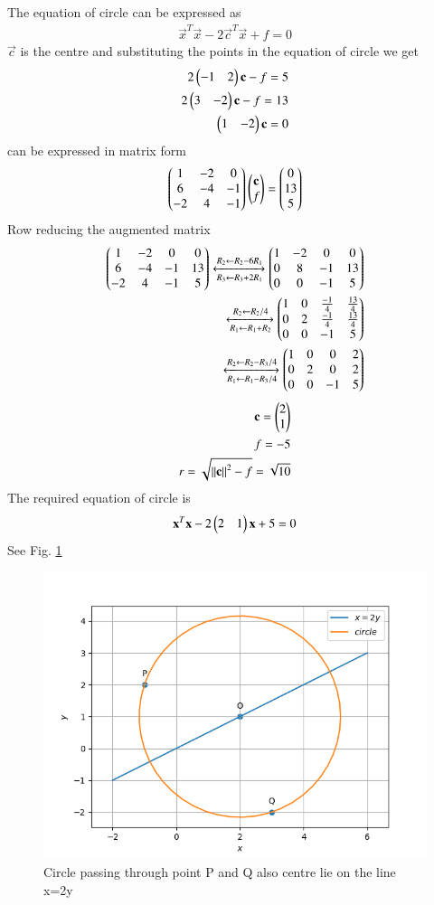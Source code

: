 The equation of circle can be expressed as
\begin{align}
    \vec{x}^T\vec{x}-2\vec{c}^T\vec{x}+f = 0
\end{align}
$\vec{c}$ is the centre  and substituting the points in the equation of circle we get
\begin{align}
2\begin{pmatrix}-1&2\end{pmatrix}\mathbf{c}-f=5\\
 2\begin{pmatrix}3&-2\end{pmatrix}\mathbf{c}-f=13\\
\begin{pmatrix}1&-2\end{pmatrix}\mathbf{c}=0
\end{align}
can be expressed in matrix form
\begin{align}
\begin{pmatrix}1&-2&0\\6&-4&-1\\-2&4&-1\end{pmatrix}\begin{pmatrix}\mathbf{c}\\f\end{pmatrix} = \begin{pmatrix}0\\13\\5\end{pmatrix}
\end{align}
Row reducing the augmented matrix
\begin{align}
\begin{pmatrix}1&-2&0&0\\6&-4&-1&13\\-2&4&-1&5\end{pmatrix}
\xleftrightarrow[R_3\leftarrow R_3+2R_1]{R_2\leftarrow R_2-6R_1}
\begin{pmatrix}1&-2&0&0\\0&8&-1&13\\0&0&-1&5\end{pmatrix}\\
\xleftrightarrow[R_1\leftarrow R_1+R_2]{R_2\leftarrow R_2/4}
\begin{pmatrix}1&0&\frac{-1}{4}&\frac{13}{4}\\0&2&\frac{-1}{4}&\frac{13}{4}\\0&0&-1&5\end{pmatrix}\\
\xleftrightarrow[R_1\leftarrow R_1-R_3/4]{R_2\leftarrow R_2-R_3/4}
\begin{pmatrix}1&0&0&2\\0&2&0&2\\0&0&-1&5\end{pmatrix}
\end{align}
\begin{align}
    \mathbf{c} = \begin{pmatrix}2\\1\end{pmatrix}\\
    f = -5\\
    r=\sqrt{\left\lVert\mathbf{c}\right\rVert^2-f} = \sqrt{10}
\end{align}
The required equation of circle is 
\begin{align}
\mathbf{x}^T\mathbf{x}-2\begin{pmatrix}2&1\end{pmatrix}\mathbf{x}+5 = 0
\end{align}
See Fig. \ref{Fig:solutions4/1/5/}

\begin{figure}[!ht]
\centering
\includegraphics[width=\columnwidth]{./solutions/4/1/5/circle.png}
\caption{Circle passing through point P and Q also centre lie on the line x=2y}
\label{Fig:solutions4/1/5/}
\end{figure}
